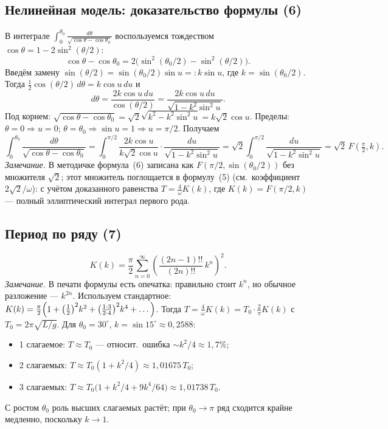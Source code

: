 \documentclass[12pt,a4paper]{article}
\begin{document}
\subsection*{Нелинейная модель: доказательство формулы (6)}

В интеграле
$\displaystyle\int_0^{\theta_0}\!\frac{d\theta}{\sqrt{\cos\theta-\cos\theta_0}}$
воспользуемся тождеством $\cos\theta=1-2\sin^2(\theta/2)$:
\[
  \cos\theta-\cos\theta_0
  = 2\bigl(\sin^2(\theta_0/2)-\sin^2(\theta/2)\bigr).
\]
Введём замену $\sin(\theta/2)=\sin(\theta_0/2)\sin u =: k\sin u$, где
$k=\sin(\theta_0/2)$. Тогда
$\tfrac{1}{2}\cos(\theta/2)\,d\theta = k\cos u\,du$ и
\[
  d\theta = \frac{2k\cos u\,du}{\cos(\theta/2)}
         = \frac{2k\cos u\,du}{\sqrt{1-k^2\sin^2 u}}.
\]
Под корнем:
$\sqrt{\cos\theta-\cos\theta_0}=\sqrt{2}\sqrt{k^2-k^2\sin^2 u}
= k\sqrt{2}\cos u$. Пределы: $\theta=0\Rightarrow u=0$;
$\theta=\theta_0\Rightarrow \sin u=1\Rightarrow u=\pi/2$. Получаем
\[
  \int_0^{\theta_0}\!\frac{d\theta}{\sqrt{\cos\theta-\cos\theta_0}}
  = \int_0^{\pi/2}\!\frac{2k\cos u}{k\sqrt{2}\cos u}\cdot
    \frac{du}{\sqrt{1-k^2\sin^2 u}}
  = \sqrt{2}\int_0^{\pi/2}\!\frac{du}{\sqrt{1-k^2\sin^2 u}}
  = \sqrt{2}\,F\!\left(\tfrac{\pi}{2},k\right).
\]
\textit{Замечание.} В методичке формула~(6) записана как
$F(\pi/2,\sin(\theta_0/2))$ без множителя $\sqrt2$; этот множитель
поглощается в формулу~(5) (см.\ коэффициент $2\sqrt2/\omega$): с учётом
доказанного равенства $T=\tfrac{4}{\omega}K(k)$, где $K(k)=F(\pi/2,k)$ ---
полный эллиптический интеграл первого рода.

\subsection*{Период по ряду (7)}

\[
  K(k)=\frac{\pi}{2}\sum_{n=0}^{\infty}\!\left(\frac{(2n-1)!!}{(2n)!!}\,k^{n}\right)^{\!2}.
\]
\emph{Замечание.} В печати формулы есть опечатка: правильно стоит $k^n$, но
обычное разложение --- $k^{2n}$. Используем стандартное:
$K(k)=\frac{\pi}{2}\Bigl(1+\bigl(\tfrac12\bigr)^2 k^2
+\bigl(\tfrac{1\cdot3}{2\cdot4}\bigr)^2 k^4+\dots\Bigr)$.
Тогда $T=\tfrac{4}{\omega}K(k)=T_0\cdot\tfrac{2}{\pi}K(k)$ с
$T_0=2\pi\sqrt{L/g}$. Для $\theta_0=30^\circ$, $k=\sin15^\circ\approx0{,}2588$:
\begin{itemize}
  \item 1 слагаемое: $T\approx T_0$ --- относит.\ ошибка $\sim k^2/4\approx1{,}7\%$;
  \item 2 слагаемых: $T\approx T_0(1+k^2/4)\approx 1{,}01675\,T_0$;
  \item 3 слагаемых: $T\approx T_0\bigl(1+k^2/4+9k^4/64\bigr)
        \approx 1{,}01738\,T_0$.
\end{itemize}
С ростом $\theta_0$ роль высших слагаемых растёт; при $\theta_0\to\pi$
ряд сходится крайне медленно, поскольку $k\to 1$.
\end{document}

